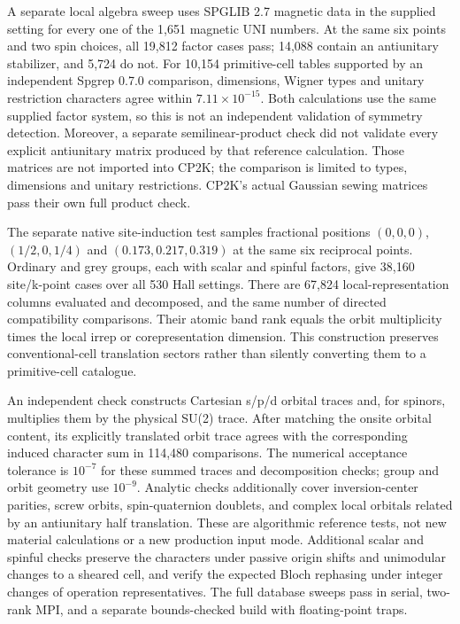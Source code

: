 \documentclass[11pt]{article}
\begin{document}
A separate local algebra sweep uses SPGLIB 2.7 magnetic data in the
supplied setting for every one of the 1,651 magnetic UNI numbers.
At the same six points and two spin choices, all 19,812 factor cases
pass; 14,088 contain an antiunitary stabilizer, and 5,724 do not.
For 10,154 primitive-cell tables supported by an independent
Spgrep 0.7.0 comparison, dimensions, Wigner types and unitary
restriction characters agree within $7.11\times10^{-15}$.
Both calculations use the same supplied factor system, so this is
not an independent validation of symmetry detection. Moreover, a
separate semilinear-product check did not validate every explicit
antiunitary matrix produced by that reference calculation.
Those matrices are not imported into CP2K; the comparison is limited
to types, dimensions and unitary restrictions. CP2K's actual Gaussian
sewing matrices pass their own full product check.

The separate native site-induction test samples fractional positions
$(0,0,0)$, $(1/2,0,1/4)$ and $(0.173,0.217,0.319)$ at the same six
reciprocal points. Ordinary and grey groups, each with scalar and
spinful factors, give 38,160 site/k-point cases over all 530 Hall
settings. There are 67,824 local-representation columns evaluated and
decomposed, and the same number of directed compatibility comparisons.
Their atomic band rank equals the orbit multiplicity times the local
irrep or corepresentation dimension. This construction preserves
conventional-cell translation sectors rather than silently converting
them to a primitive-cell catalogue.

An independent check constructs Cartesian s/p/d orbital traces and,
for spinors, multiplies them by the physical SU(2) trace. After matching
the onsite orbital content, its explicitly translated orbit trace
agrees with the corresponding induced character sum in 114,480
comparisons. The numerical acceptance tolerance is $10^{-7}$ for
these summed traces and decomposition checks; group and orbit geometry
use $10^{-9}$. Analytic checks additionally cover inversion-center
parities, screw orbits, spin-quaternion doublets, and complex local
orbitals related by an antiunitary half translation. These are
algorithmic reference tests, not new material calculations or a new
production input mode.
Additional scalar and spinful checks preserve the characters under
passive origin shifts and unimodular changes to a sheared cell, and
verify the expected Bloch rephasing under integer changes of operation
representatives. The full database sweeps pass in serial, two-rank MPI,
and a separate bounds-checked build with floating-point traps.
\end{document}
